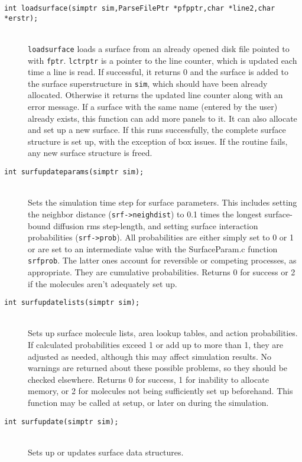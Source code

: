 \documentclass {book}
\begin{document}
\begin{description}
\item[\texttt{int loadsurface(simptr sim,ParseFilePtr *pfpptr,char *line2,char *erstr);}]
\hfill \\
\texttt{loadsurface} loads a surface from an already opened disk file pointed to with \texttt{fptr}.  \texttt{lctrptr} is a pointer to the line counter, which is updated each time a line is read.  If successful, it returns 0 and the surface is added to the surface superstructure in \texttt{sim}, which should have been already allocated.  Otherwise it returns the updated line counter along with an error message.  If a surface with the same name (entered by the user) already exists, this function can add more panels to it.  It can also allocate and set up a new surface.  If this runs successfully, the complete surface structure is set up, with the exception of box issues.  If the routine fails, any new surface structure is freed.

\item[\texttt{int surfupdateparams(simptr sim);}]
\hfill \\
Sets the simulation time step for surface parameters.  This includes setting the neighbor distance (\texttt{srf->neighdist}) to 0.1 times the longest surface-bound diffusion rms step-length, and setting surface interaction probabilities (\texttt{srf->prob}).  All probabilities are either simply set to 0 or 1 or are set to an intermediate value with the SurfaceParam.c function \texttt{srfprob}.  The latter ones account for reversible or competing processes, as appropriate.  They are cumulative probabilities.  Returns 0 for success or 2 if the molecules aren't adequately set up.

\item[\texttt{int surfupdatelists(simptr sim);}]
\hfill \\
Sets up surface molecule lists, area lookup tables, and action probabilities.  If calculated probabilities exceed 1 or add up to more than 1, they are adjusted as needed, although this may affect simulation results.  No warnings are returned about these possible problems, so they should be checked elsewhere.  Returns 0 for success, 1 for inability to allocate memory, or 2 for molecules not being sufficiently set up beforehand.  This function may be called at setup, or later on during the simulation.

\item[\texttt{int surfupdate(simptr sim);}]
\hfill \\
Sets up or updates surface data structures.


\end{description}
\end{document}
